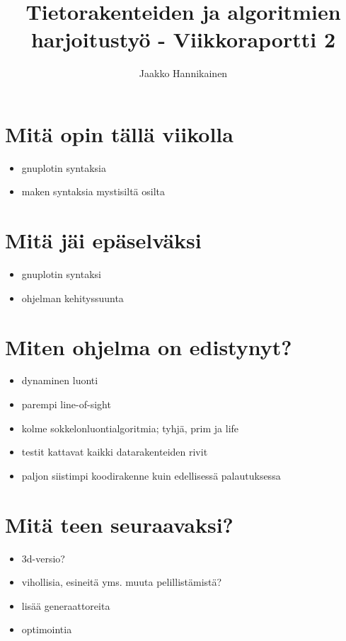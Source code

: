 \documentclass{article}
\author{Jaakko Hannikainen}
\title{Tietorakenteiden ja algoritmien harjoitustyö - Viikkoraportti 2}
\begin{document}
\maketitle

\section{Mitä opin tällä viikolla}
\begin{itemize}
    \item gnuplotin syntaksia
    \item maken syntaksia mystisiltä osilta
\end{itemize}

\section{Mitä jäi epäselväksi}
\begin{itemize}
    \item gnuplotin syntaksi
    \item ohjelman kehityssuunta
\end{itemize}

\section{Miten ohjelma on edistynyt?}
\begin{itemize}
    \item dynaminen luonti
    \item parempi line-of-sight
    \item kolme sokkelonluontialgoritmia; tyhjä, prim ja life
    \item testit kattavat kaikki datarakenteiden rivit
    \item paljon siistimpi koodirakenne kuin edellisessä palautuksessa
\end{itemize}

\section{Mitä teen seuraavaksi?}
\begin{itemize}
    \item 3d-versio?
    \item vihollisia, esineitä yms. muuta pelillistämistä?
    \item lisää generaattoreita
    \item optimointia
\end{itemize}

\texttt{}
\end{document}
